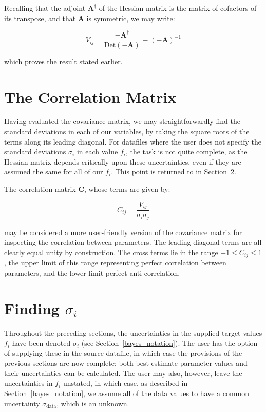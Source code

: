 \documentclass[a4paper,onecolumn,11pt]{book}
\begin{document}
Recalling that the adjoint $\mathbf{A}^\dagger$ of the Hessian matrix is the
matrix of cofactors of its transpose, and that $\mathbf{A}$ is symmetric, we
may write:

\begin{equation}
V_{ij} = \frac{-\mathbf{A}^\dagger}{\mathrm{Det}(\mathbf{-A})} \equiv (-\mathbf{A})^{-1}
\end{equation}

\noindent which proves the result stated earlier.

\section{The Correlation Matrix}
\label{correlation_matrix}

Having evaluated the covariance matrix, we may straightforwardly find the
standard deviations in each of our variables, by taking the square roots of the
terms along its leading diagonal. For datafiles where the user does not specify
the standard deviations $\sigma_i$ in each value $f_i$, the task is not quite
complete, as the Hessian matrix depends critically upon these uncertainties,
even if they are assumed the same for all of our $f_i$. This point is returned
to in Section~\ref{finding_sigmai}.

The correlation matrix $\mathbf{C}$, whose terms are given by:

\begin{equation}
C_{ij} = \frac{V_{ij}}{\sigma_i\sigma_j}
\end{equation}

\noindent may be considered a more user-friendly version of the covariance
matrix for inspecting the correlation between parameters. The leading diagonal
terms are all clearly equal unity by construction. The cross terms lie in the
range $-1 \leq C_{ij} \leq 1$, the upper limit of this range representing
perfect correlation between parameters, and the lower limit perfect
anti-correlation.

\section{Finding $\sigma_i$}
\label{finding_sigmai}

Throughout the preceding sections, the uncertainties in the supplied target
values $f_i$ have been denoted $\sigma_i$ (see Section~\ref{bayes_notation}).
The user has the option of supplying these in the source datafile, in which
case the provisions of the previous sections are now complete; both
best-estimate parameter values and their uncertainties can be calculated. The
user may also, however, leave the uncertainties in $f_i$ unstated, in which
case, as described in Section~\ref{bayes_notation}, we assume all of the data
values to have a common uncertainty $\sigma_\mathrm{data}$, which is an
unknown.
\end{document}
